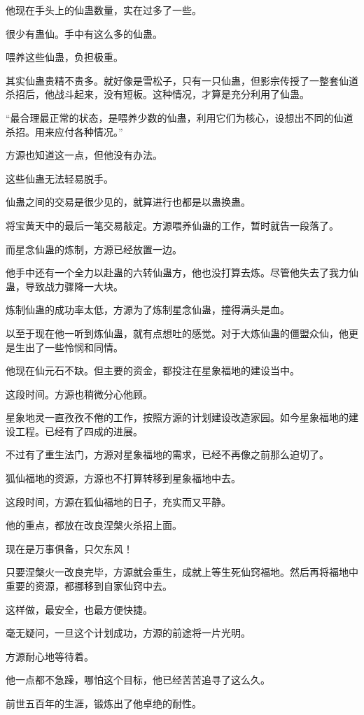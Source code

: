 \begin{this_body}
他现在手头上的仙蛊数量，实在过多了一些。

很少有蛊仙。手中有这么多的仙蛊。

喂养这些仙蛊，负担极重。

其实仙蛊贵精不贵多。就好像是雪松子，只有一只仙蛊，但影宗传授了一整套仙道杀招后，他战斗起来，没有短板。这种情况，才算是充分利用了仙蛊。

“最合理最正常的状态，是喂养少数的仙蛊，利用它们为核心，设想出不同的仙道杀招。用来应付各种情况。”

方源也知道这一点，但他没有办法。

这些仙蛊无法轻易脱手。

仙蛊之间的交易是很少见的，就算进行也都是以蛊换蛊。

将宝黄天中的最后一笔交易敲定。方源喂养仙蛊的工作，暂时就告一段落了。

而星念仙蛊的炼制，方源已经放置一边。

他手中还有一个全力以赴蛊的六转仙蛊方，他也没打算去炼。尽管他失去了我力仙蛊，导致战力骤降一大块。

炼制仙蛊的成功率太低，方源为了炼制星念仙蛊，撞得满头是血。

以至于现在他一听到炼仙蛊，就有点想吐的感觉。对于大炼仙蛊的僵盟众仙，他更是生出了一些怜悯和同情。

他现在仙元石不缺。但主要的资金，都投注在星象福地的建设当中。

这段时间。方源也稍微分心他顾。

星象地灵一直孜孜不倦的工作，按照方源的计划建设改造家园。如今星象福地的建设工程。已经有了四成的进展。

不过有了重生法门，方源对星象福地的需求，已经不再像之前那么迫切了。

狐仙福地的资源，方源也不打算转移到星象福地中去。

这段时间，方源在狐仙福地的日子，充实而又平静。

他的重点，都放在改良涅槃火杀招上面。

现在是万事俱备，只欠东风！

只要涅槃火一改良完毕，方源就会重生，成就上等生死仙窍福地。然后再将福地中重要的资源，都挪移到自家仙窍中去。

这样做，最安全，也最方便快捷。

毫无疑问，一旦这个计划成功，方源的前途将一片光明。

方源耐心地等待着。

他一点都不急躁，哪怕这个目标，他已经苦苦追寻了这么久。

前世五百年的生涯，锻炼出了他卓绝的耐性。


\end{this_body}
